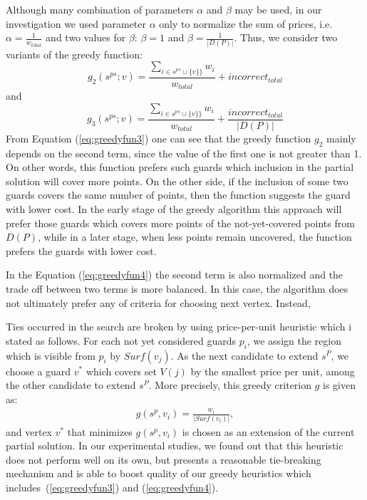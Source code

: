 \documentclass[runningheads,a4paper]{elsarticle}
\begin{document}
	Although many combination of parameters $ \alpha $ and $\beta$ may be used, in our investigation we used parameter $\alpha$  only to normalize the sum of prices, i.e. $\alpha = \frac{1}{w_{total}}$ and two values for $\beta$: $\beta = 1$ and $\beta = \frac{1}{|D(P)|}$. Thus, we consider two variants of the greedy function:
	\begin{equation}\label{eq:greedyfun3}
	g_2(s^{ps}; v)  =  \frac{\sum_{i \in s^{ps} \cup \{v\}\}} w_i}{w_{total}}+ incorrect_{total}
	\end{equation}
	and
	\begin{equation}\label{eq:greedyfun4}
	g_3(s^{ps}; v)  =    \frac{\sum_{i \in s^{ps} \cup \{v\}\}} w_i}{w_{total}}+ \frac{incorrect_{total}}{|D(P)|}
	\end{equation}
	From Equation (\ref{eq:greedyfun3}) one can see that the greedy function $g_2$ mainly depends on the second term, since the value of the first one is not greater than 1. On other words, this function prefers such guards  which inclusion in the partial solution will cover more points. On the other side, if the inclusion of some two guards covers the same number of points, then the function suggests  the guard with lower cost. In the early stage of the greedy algorithm this approach will prefer those guards which covers more points of the not-yet-covered points from $D(P)$, while in a later stage, when less points remain uncovered, the function prefers the guards with lower cost.
	
	
	In the Equation  (\ref{eq:greedyfun4}) the second term is also normalized and the trade off between two terms is more balanced.
	In this case, the algorithm does not  ultimately prefer any of criteria for choosing next vertex. Instead,  
	
	
	Ties occurred in the search are broken by using  price-per-unit heuristic which i stated as follows.
	For each not yet considered guards $p_i$, we assign the region which is visible from $p_i$ by $Surf(v_j)$. As the next candidate to extend $s^P$, we choose a guard $v^*$ which covers set $V(j)$ by the smallest price per unit, among the other candidate to extend $s^P$. More precisely, this greedy criterion $g$ is given as:
	\begin{align}
	g(s^p, v_i) = \frac{w_{i}}{|Surf({v_i})|},
	\end{align}
	and vertex $v^*$ that minimizes $g(s^p, v_i)$ is chosen as an extension of the current partial solution.
	In our experimental studies, we found out that this heuristic does not perform well on its own, but presents a reasonable tie-breaking mechanism and is able to boost quality of our greedy heuristics which includes~(\ref{eq:greedyfun3}) and (\ref{eq:greedyfun4}). 
\end{document}
